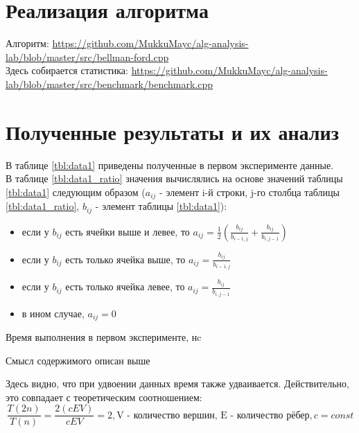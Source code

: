 \documentclass[a4paper,12pt]{article}
\begin{document}
\section{Реализация алгоритма}
Алгоритм:
\url{https://github.com/MukkuMayc/alg-analysis-lab/blob/master/src/bellman-ford.cpp} \\
Здесь собирается статистика:
\url{https://github.com/MukkuMayc/alg-analysis-lab/blob/master/src/benchmark/benchmark.cpp}
\section{Полученные результаты и их анализ}
В таблице \ref{tbl:data1} приведены полученные в первом эксперименте данные. \\
В таблице \ref{tbl:data1_ratio} значения вычислялись на основе значений таблицы \ref{tbl:data1} следующим образом
($a_{ij}$ - элемент i-й строки, j-го столбца таблицы \ref{tbl:data1_ratio}, $b_{ij}$ - элемент таблицы \ref{tbl:data1}):
\begin{itemize}
  \item если у $b_{ij}$ есть ячейки выше и левее, то 
  $a_{ij} = \frac12 \left(\frac{b_{ij}}{b_{i-1, j}} + \frac{b_{ij}}{b_{i, j-1}}\right)$
  \item если у $b_{ij}$ есть только ячейка выше, то
  $a_{ij} = \frac{b_{ij}}{b_{i-1, j}}$ 
  \item если у $b_{ij}$ есть только ячейка левее, то
  $a_{ij} = \frac{b_{ij}}{b_{i, j-1}}$
  \item в ином случае, $a_{ij} = 0$
\end{itemize}
\newpage
\begin{center}
  \begin{table}[h]
    \centering
    \caption{Время выполнения в первом эксперименте, нc}
    \label{tbl:data1}
  \end{table}
  \begin{table}[h]
    \centering
    \caption{Смысл содержимого описан выше}
    \label{tbl:data1_ratio}
  \end{table}
\end{center}

Здесь видно, что при удвоении данных время также удваивается.
Действительно, это совпадает с теоретическим соотношением:
\[
  \frac{T(2n)}{T(n)} = \frac{2 (c E V)}{c E V} = 2, \textrm{V - количество вершин, E - количество рёбер}, c = const
\]
\end{document}
